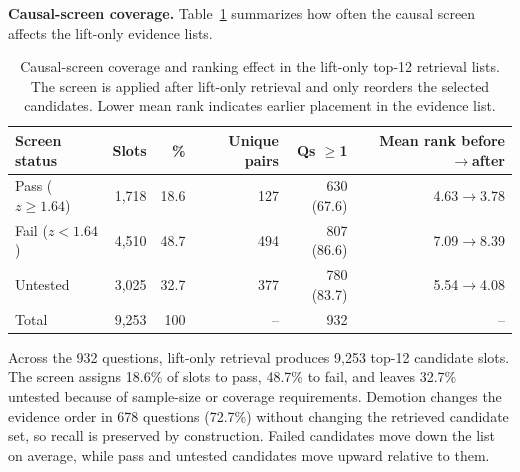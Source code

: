 \documentclass[runningheads]{llncs}
\begin{document}
\smallskip\noindent\textbf{Causal-screen coverage.}
Table~\ref{tab:screen} summarizes how often the causal screen affects the lift-only evidence lists. 
\begin{table}[!b]\centering
\caption{Causal-screen coverage and ranking effect in the lift-only top-12 retrieval lists. The screen is applied after lift-only retrieval and only reorders the selected candidates. Lower mean rank indicates earlier placement in the evidence list.}
\label{tab:screen}
\scriptsize
\setlength{\tabcolsep}{3pt}
\begin{tabular}{lrrrrr}\toprule
Screen status & Slots & \% & Unique pairs & Qs $\geq$1 & Mean rank before$\to$after \\\midrule
Pass ($z\geq1.64$) & 1{,}718 & 18.6 & 127 & 630 (67.6) & 4.63$\to$3.78 \\
Fail ($z<1.64$) & 4{,}510 & 48.7 & 494 & 807 (86.6) & 7.09$\to$8.39 \\
Untested & 3{,}025 & 32.7 & 377 & 780 (83.7) & 5.54$\to$4.08 \\
Total & 9{,}253 & 100 & -- & 932 & -- \\\bottomrule
\end{tabular}
\end{table}
Across the 932 questions, lift-only retrieval produces 9,253 top-12 candidate slots. The screen assigns 18.6\% of slots to pass, 48.7\% to fail, and leaves 32.7\% untested because of sample-size or coverage requirements. Demotion changes the evidence order in 678 questions (72.7\%) without changing the retrieved candidate set, so recall is preserved by construction. Failed candidates move down the list on average, while pass and untested candidates move upward relative to them.
\end{document}
